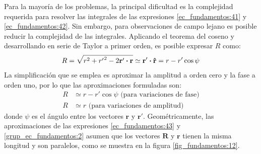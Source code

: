 Para la mayoría de los problemas, la principal dificultad es la complejidad requerida para resolver las integrales de las expresiones \eqref{ec_fundamentos:41} y \eqref{ec_fundamentos:42}. Sin embargo, para observaciones de campo lejano es posible reducir la complejidad de las integrales. Aplicando el teorema del coseno y desarrollando en serie de Taylor a primer orden, es posible expresar $R$ como:
\begin{align}
R = \sqrt{r^2 +{r'}^2 - 2\mathbf{r}'\boldsymbol{\cdot}\mathbf{r}} \simeq \mathbf{r}'\boldsymbol{\cdot}\bm{\mathbf{\hat{r}}} = r - r'\cos\psi
\label{ec_fundamentos:43}
\end{align}
La simplificación que se emplea es aproximar la amplitud a orden cero y la fase a orden uno, por lo que las aproximaciones formuladas son:
\begin{subequations}
\label{grup_ec_fundamentos:2}
\begin{align}
R &\simeq r - r'\cos\psi \mbox{ (para variaciones de fase)}
\label{ec_fundamentos:44}\\
R &\simeq r \mbox{ (para variaciones de amplitud)}
\label{ec_fundamentos:45}
\end{align}
\end{subequations}
donde $\psi$ es el ángulo entre los vectores $\mathbf{r}$ y $\mathbf{r}'$. Geométricamente, las aproximaciones de las expresiones \eqref{ec_fundamentos:43} y \eqref{grup_ec_fundamentos:2} asumen que los vectores $\mathbf{R}$ y $\mathbf{r}$ tienen la misma longitud y son paralelos, como se muestra en la figura \ref{fig_fundamentos:12}.

